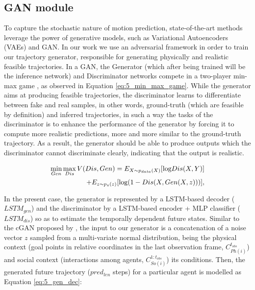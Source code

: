 \subsection{\ac{GAN} module}
\label{subsec:5_gan_module}

To capture the stochastic nature of motion prediction, state-of-the-art methods leverage the power of generative models, such as Variational Autoencoders (VAEs) and \acf{GAN}. In our work we use an adversarial framework in order to train our trajectory generator, responsible for generating physically and realistic feasible trajectories. In a \ac{GAN}, the Generator (which after being trained will be the inference network) and Discriminator networks compete in a two-player min-max game \cite{goodfellow2020generative}, as observed in Equation \ref{eq:5_min_max_game}. While the generator aims at producing feasible trajectories, the discriminator learns to differentiate between fake and real samples, in other words, ground-truth (which are feasible by definition) and inferred trajectories, in such a way the tasks of the discriminator is to enhance the performance of the generator by forcing it to compute more realistic predictions, more and more similar to the ground-truth trajectory. As a result, the generator should be able to produce outputs which the discriminator cannot discriminate clearly, indicating that the output is realistic. 

\begin{eqnarray}
	\label{eq:5_min_max_game}
	&&\hspace{-10mm} \min_{Gen} \max_{Dis} V(Dis, Gen)=E_{X \sim p_{data}(X)}[\mbox{log} Dis(X,Y)] \nonumber \\
	&&\hspace{15mm} + E_{z \sim p_z(z)}[\mbox{log} (1 - Dis(X, Gen(X,z)))],
\end{eqnarray}

In the present case, the generator is represented by a \ac{LSTM}-based decoder ($LSTM_{gen}$) and the discriminator by a \ac{LSTM}-based encoder + \ac{MLP} classifier  ($LSTM_{dis}$) so as to estimate the temporally dependent future states. Similar to the \ac{cGAN} proposed by \cite{sadeghian2019sophie}, the input to our generator is a concatenation of a noise vector $z$ sampled from a multi-variate normal distribution, being the physical context (goal points in relative coordinates in the last observation frame, $C_{Ph(i)}^{t_{obs}}$) and social context (interactions among agents, $C_{So(i)}^{1:t_{obs}}$) its conditions. Then, the generated future trajectory ($pred_{len}$ steps) for a particular agent is modelled as Equation \ref{eq:5_gen_dec}:

